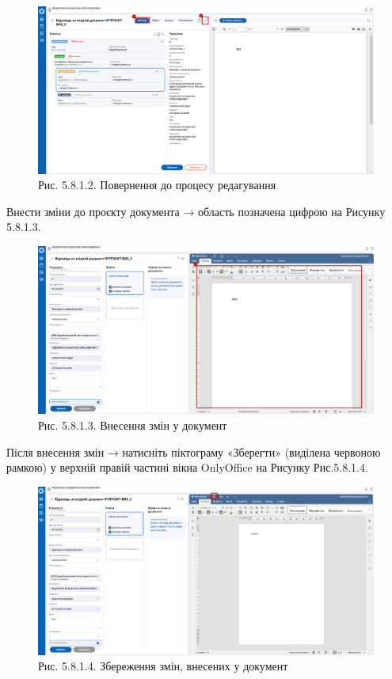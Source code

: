 \begin{figure}[!htbp]
\centerline{\includegraphics[width=\textwidth]{img/5.8.1.2.png}}
\caption{Рис. 5.8.1.2. Повернення до процесу редагування}
\end{figure}

Внести зміни до проєкту документа → область позначена цифрою  на Рисунку 5.8.1.3.

\begin{figure}[!htbp]
\centerline{\includegraphics[width=\textwidth]{img/5.8.1.3.png}}
\caption{Рис. 5.8.1.3. Внесення змін у документ}
\end{figure}

Після внесення змін → натисніть піктограму «Зберегти» (виділена
червоною рамкою) у верхній правій частині вікна OnlyOffice на Рисунку Рис.5.8.1.4.

\begin{figure}[!htbp]
\centerline{\includegraphics[width=\textwidth]{img/5.8.1.4.png}}
\caption{Рис. 5.8.1.4. Збереження змін, внесених у документ}
\end{figure}

